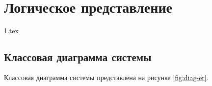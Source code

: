 \section{Логическое представление}
{1.tex}

\subsection{Классовая диаграмма системы}
Классовая диаграмма системы представлена на рисунке \ref{fig:diag-er}.
